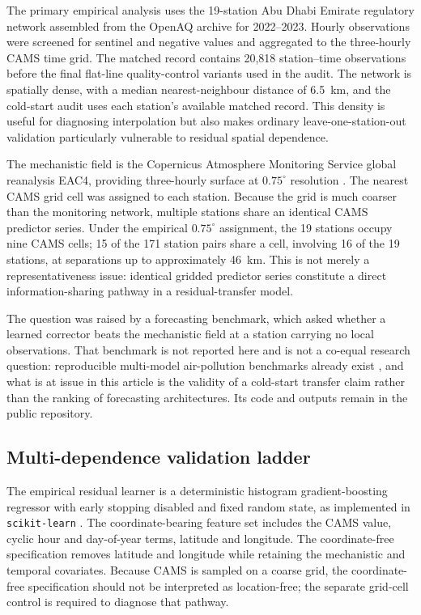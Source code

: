 The primary empirical analysis uses the 19-station Abu Dhabi Emirate regulatory \pmten{} network assembled from the OpenAQ archive \citep{rosales2025} for 2022--2023. Hourly observations were screened for sentinel and negative values and aggregated to the three-hourly CAMS time grid. The matched record contains 20,818 station--time observations before the final flat-line quality-control variants used in the audit. The network is spatially dense, with a median nearest-neighbour distance of 6.5~km, and the cold-start audit uses each station's available matched record. This density is useful for diagnosing interpolation but also makes ordinary leave-one-station-out validation particularly vulnerable to residual spatial dependence.

The mechanistic field is the Copernicus Atmosphere Monitoring Service global reanalysis EAC4, providing three-hourly surface \pmten{} at $0.75^{\circ}$ resolution \citep{inness2019,flemming2015}. The nearest CAMS grid cell was assigned to each station. Because the grid is much coarser than the monitoring network, multiple stations share an identical CAMS predictor series. Under the empirical $0.75^{\circ}$ assignment, the 19 stations occupy nine CAMS cells; 15 of the 171 station pairs share a cell, involving 16 of the 19 stations, at separations up to approximately 46~km. This is not merely a representativeness issue: identical gridded predictor series constitute a direct information-sharing pathway in a residual-transfer model.

The question was raised by a forecasting benchmark, which asked whether a learned corrector beats the mechanistic field at a station carrying no local observations. That benchmark is not reported here and is not a co-equal research question: reproducible multi-model air-pollution benchmarks already exist \citep{chisilev2026}, and what is at issue in this article is the validity of a cold-start transfer claim rather than the ranking of forecasting architectures. Its code and outputs remain in the public repository.

\subsection{Multi-dependence validation ladder}

The empirical residual learner is a deterministic histogram gradient-boosting regressor \citep{friedman2001} with early stopping disabled and fixed random state, as implemented in \texttt{scikit-learn} \citep{pedregosa2011}. The coordinate-bearing feature set includes the CAMS value, cyclic hour and day-of-year terms, latitude and longitude. The coordinate-free specification removes latitude and longitude while retaining the mechanistic and temporal covariates. Because CAMS is sampled on a coarse grid, the coordinate-free specification should not be interpreted as location-free; the separate grid-cell control is required to diagnose that pathway.

